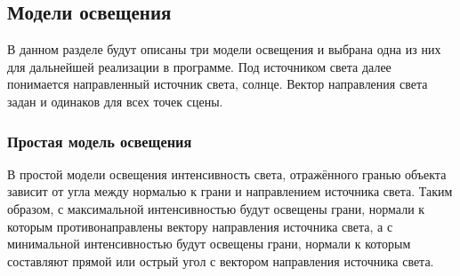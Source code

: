 



\subsection{Модели освещения}

В данном разделе будут описаны три модели освещения и выбрана одна из них для дальнейшей реализации в программе.
Под источником света далее понимается направленный источник света, солнце.
Вектор направления света задан и одинаков для всех точек сцены.

\subsubsection{Простая модель освещения}

В простой модели освещения интенсивность света, отражённого гранью объекта зависит от угла между нормалью к грани и направлением источника света.
Таким образом, с максимальной интенсивностью будут освещены грани, нормали к которым противонаправлены вектору направления источника света, а с минимальной интенсивностью будут освещены грани, нормали к которым составляют прямой или острый угол с вектором направления источника света.


